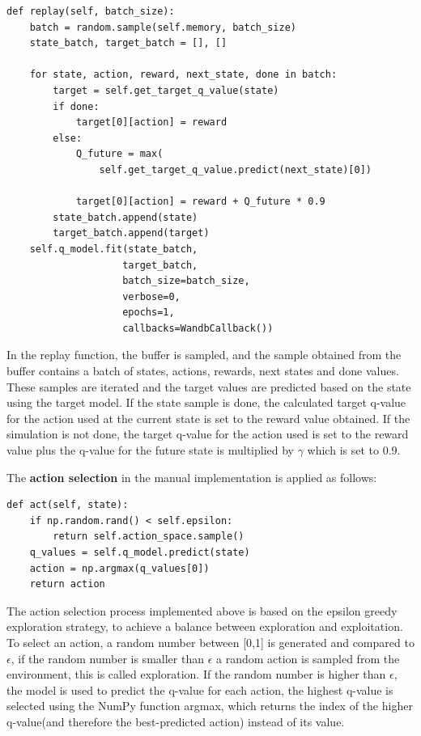\lstset{language=Python}
\lstset{frame=lines}
\lstset{basicstyle=\footnotesize}
\begin{lstlisting}
def replay(self, batch_size):
    batch = random.sample(self.memory, batch_size)
    state_batch, target_batch = [], []

    for state, action, reward, next_state, done in batch:
        target = self.get_target_q_value(state)
        if done:
            target[0][action] = reward
        else:
            Q_future = max(
                self.get_target_q_value.predict(next_state)[0])

            target[0][action] = reward + Q_future * 0.9
        state_batch.append(state)
        target_batch.append(target)
    self.q_model.fit(state_batch,
                    target_batch,
                    batch_size=batch_size,
                    verbose=0,
                    epochs=1,
                    callbacks=WandbCallback())
\end{lstlisting}

In the replay function, the buffer is sampled, and the sample obtained from the buffer contains a batch of states, actions, rewards, next states and done values.
These samples are iterated and the target values are predicted based on the state using the target model.
If the state sample is done, the calculated target q-value for the action used at the current state is set to the reward value obtained. If the simulation is not done, the target q-value for the action used is set to the reward value plus the q-value for the future state is multiplied by $\gamma$ which is set to 0.9.

The \textbf{action selection} in the manual implementation is applied as follows:

\lstset{language=Python}
\lstset{frame=lines}
\lstset{basicstyle=\footnotesize}
\begin{lstlisting}
def act(self, state):
    if np.random.rand() < self.epsilon:
        return self.action_space.sample()
    q_values = self.q_model.predict(state)
    action = np.argmax(q_values[0])
    return action
\end{lstlisting}

The action selection process implemented above is based on the epsilon greedy exploration strategy, to achieve a balance between exploration and exploitation. To select an action, a random number between [0,1] is generated and compared to $\epsilon$, if the random number is smaller than $\epsilon$ a random action is sampled from the environment, this is called exploration. If the random number is higher than $\epsilon$, the model is used to predict the q-value for each action, the highest q-value is selected using the NumPy function argmax, which returns the index of the higher q-value(and therefore the best-predicted action) instead of its value.

